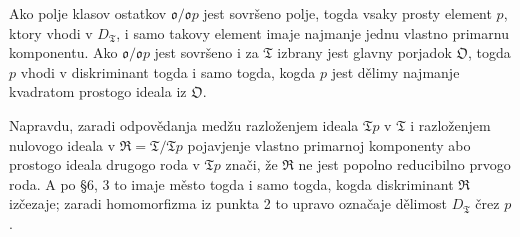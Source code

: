 \documentclass[11pt]{article}
\newcommand{\mo}{\mathfrak{o}}
\newcommand{\mO}{\mathfrak{O}}
\newcommand{\mT}{\mathfrak{T}}
\newcommand{\mR}{\mathfrak{R}}
\begin{document}
\setcounter{footnote}{29}

\noindent Ako polje klasov ostatkov $\mo/\mo p$ jest sovršeno polje, togda vsaky prosty element $p$, ktory vhodi v $D_\mT$, i samo takovy element imaje najmanje jednu vlastno primarnu komponentu. Ako $\mo/\mo p$ jest sovršeno i za $\mT$ izbrany jest glavny porjadok $\mO$, togda $p$ vhodi v diskriminant togda i samo togda, kogda $p$ jest dělimy najmanje kvadratom prostogo ideala iz $\mO$.

Napravdu, zaradi odpovědanja medžu razloženjem ideala $\mT p$ v $\mT$ i razloženjem nulovogo ideala v $\mR=\mT/\mT p$ pojavjenje vlastno primarnoj komponenty abo prostogo ideala drugogo roda v $\mT p$ znači, že $\mR$ ne jest popolno reducibilno prvogo roda. A po §6, 3 to imaje město togda i samo togda, kogda diskriminant $\mR$ izčezaje; zaradi homomorfizma iz punkta 2 to upravo označaje dělimost $D_\mT$ črez $p$.
\end{document}
